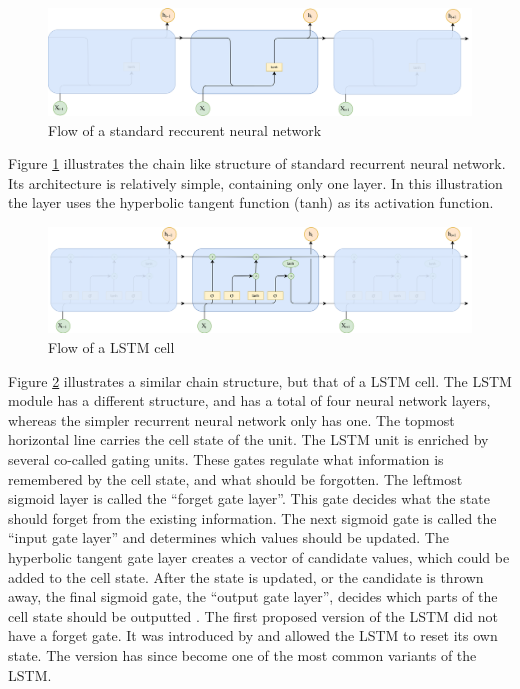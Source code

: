 \begin{figure}[ht]
    \centering
    \includegraphics[width=1\textwidth]{fig/related_work/rnn_flow.png}
    \caption{Flow of a standard reccurent neural network}
    \label{fig:nn-rnn-flow}
\end{figure}

Figure \ref{fig:nn-rnn-flow} illustrates the chain like structure of standard recurrent neural network. Its architecture is relatively simple, containing only one layer. In this illustration the layer uses the hyperbolic tangent function (tanh) as its activation function.

\begin{figure}[ht]
    \centering
    \includegraphics[width=1\textwidth]{fig/related_work/lstm_flow.png}
    \caption{Flow of a LSTM cell}
    \label{fig:nn-lstm-flow}
\end{figure}

Figure \ref{fig:nn-lstm-flow} illustrates a similar chain structure, but that of a LSTM cell. The LSTM module has a different structure, and has a total of four neural network layers, whereas the simpler recurrent neural network only has one. The topmost horizontal line carries the cell state of the unit. The LSTM unit is enriched by several co-called gating units. These gates regulate what information is remembered by the cell state, and what should be forgotten. The leftmost sigmoid layer is called the ``forget gate layer''. This gate decides what the state should forget from the existing information. The next sigmoid gate is called the ``input gate layer'' and determines which values should be updated. The hyperbolic tangent gate layer creates a vector of candidate values, which could be added to the cell state. After the state is updated, or the candidate is thrown away, the final sigmoid gate, the ``output gate layer'', decides which parts of the cell state should be outputted \citep{hochreiter1997long, goodfellow2016deeplearning, olah2015lstm, gers2002learning}. The first proposed version of the LSTM did not have a forget gate. It was introduced by \cite{gers2000learning} and allowed the LSTM to reset its own state. The version has since become one of the most common variants of the LSTM.

